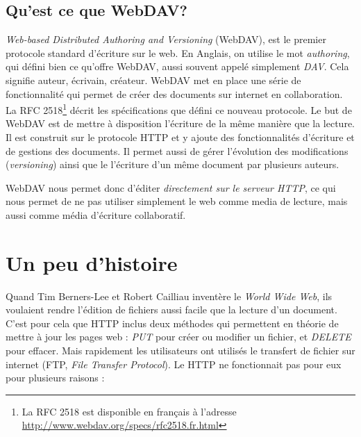 \documentclass[a4paper, 11pt]{article}
\begin{document}
{	\subsection{Qu'est ce que WebDAV?}
	
	\emph{Web-based Distributed Authoring and Versioning} (WebDAV), est le premier protocole standard d'écriture sur le web. En Anglais, on utilise le mot \emph{authoring}, qui défini bien ce qu'offre WebDAV, aussi souvent appelé simplement \emph{DAV}. Cela signifie auteur, écrivain, créateur. WebDAV met en place une série de fonctionnalité qui permet de créer des documents sur internet en collaboration. La RFC 2518\footnote{La RFC 2518 est disponible en français à l'adresse \url{http://www.webdav.org/specs/rfc2518.fr.html}} décrit les spécifications que défini ce nouveau protocole. Le but de WebDAV est de mettre à disposition l'écriture de la même manière que la lecture. Il est construit sur le protocole HTTP et y ajoute des fonctionnalités d'écriture et de gestions des documents. Il permet aussi de gérer l'évolution des modifications (\emph{versioning}) ainsi que le l'écriture d'un même document par plusieurs auteurs.
		
		WebDAV nous permet donc d'éditer \emph{directement sur le serveur HTTP}, ce qui nous permet de ne pas utiliser simplement le web comme media de lecture, mais aussi comme média d'écriture collaboratif. 
		
		
		

\section{Un peu d'histoire}

	
	Quand Tim Berners-Lee et Robert Cailliau inventère le \emph{World Wide Web}, ils voulaient rendre l'édition de fichiers aussi facile que la lecture d'un document. C'est pour cela que HTTP inclus deux méthodes qui permettent en théorie de mettre à jour les pages web : \emph{PUT} pour créer ou modifier un fichier, et \emph{DELETE} pour effacer. Mais rapidement les utilisateurs ont utilisés le transfert de fichier sur internet (FTP, \emph{File Transfer Protocol}). Le HTTP ne fonctionnait pas pour eux pour plusieurs raisons : 

}
\end{document}
